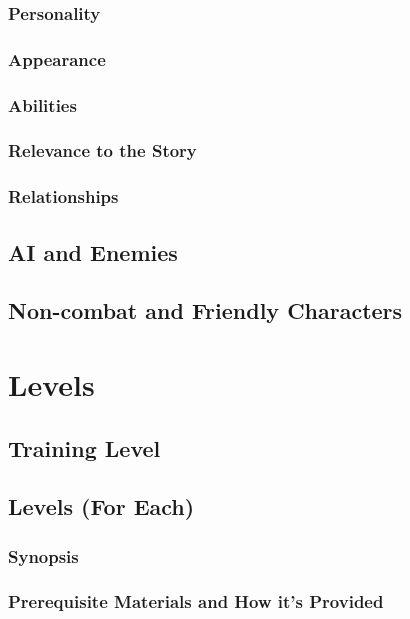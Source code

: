 \documentclass[12pt]{article}
\begin{document}
\subsubsection{Personality}

\subsubsection{Appearance}

\subsubsection{Abilities}

\subsubsection{Relevance to the Story}

\subsubsection{Relationships}

\subsection{AI and Enemies}

\subsection{Non-combat and Friendly Characters}

\section{Levels}

\subsection{Training Level}

\subsection{Levels (For Each)}

\subsubsection{Synopsis}

\subsubsection{Prerequisite Materials and How it's Provided}
\end{document}
